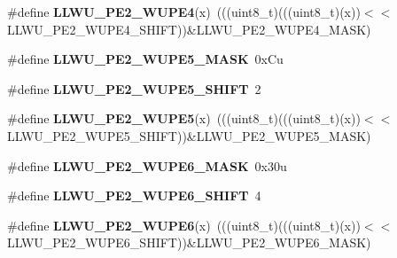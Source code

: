 \begin{DoxyCompactItemize}
\item 
\#define {\bfseries L\+L\+W\+U\+\_\+\+P\+E2\+\_\+\+W\+U\+P\+E4}(x)~(((uint8\+\_\+t)(((uint8\+\_\+t)(x))$<$$<$L\+L\+W\+U\+\_\+\+P\+E2\+\_\+\+W\+U\+P\+E4\+\_\+\+S\+H\+I\+FT))\&L\+L\+W\+U\+\_\+\+P\+E2\+\_\+\+W\+U\+P\+E4\+\_\+\+M\+A\+SK)\hypertarget{group__LLWU__Register__Masks_gadd7ab2866ab9683237ee5d6c003cf2aa}{}\label{group__LLWU__Register__Masks_gadd7ab2866ab9683237ee5d6c003cf2aa}

\item 
\#define {\bfseries L\+L\+W\+U\+\_\+\+P\+E2\+\_\+\+W\+U\+P\+E5\+\_\+\+M\+A\+SK}~0x\+Cu\hypertarget{group__LLWU__Register__Masks_gacfb855231e7a1c11c64d8b4e951817be}{}\label{group__LLWU__Register__Masks_gacfb855231e7a1c11c64d8b4e951817be}

\item 
\#define {\bfseries L\+L\+W\+U\+\_\+\+P\+E2\+\_\+\+W\+U\+P\+E5\+\_\+\+S\+H\+I\+FT}~2\hypertarget{group__LLWU__Register__Masks_ga4e823ada9bfc21dca4729eedf4e63778}{}\label{group__LLWU__Register__Masks_ga4e823ada9bfc21dca4729eedf4e63778}

\item 
\#define {\bfseries L\+L\+W\+U\+\_\+\+P\+E2\+\_\+\+W\+U\+P\+E5}(x)~(((uint8\+\_\+t)(((uint8\+\_\+t)(x))$<$$<$L\+L\+W\+U\+\_\+\+P\+E2\+\_\+\+W\+U\+P\+E5\+\_\+\+S\+H\+I\+FT))\&L\+L\+W\+U\+\_\+\+P\+E2\+\_\+\+W\+U\+P\+E5\+\_\+\+M\+A\+SK)\hypertarget{group__LLWU__Register__Masks_ga956b7d4a8e1a041de809612c0cad83e3}{}\label{group__LLWU__Register__Masks_ga956b7d4a8e1a041de809612c0cad83e3}

\item 
\#define {\bfseries L\+L\+W\+U\+\_\+\+P\+E2\+\_\+\+W\+U\+P\+E6\+\_\+\+M\+A\+SK}~0x30u\hypertarget{group__LLWU__Register__Masks_ga0db50e96153e1ca74874da97d1c22f41}{}\label{group__LLWU__Register__Masks_ga0db50e96153e1ca74874da97d1c22f41}

\item 
\#define {\bfseries L\+L\+W\+U\+\_\+\+P\+E2\+\_\+\+W\+U\+P\+E6\+\_\+\+S\+H\+I\+FT}~4\hypertarget{group__LLWU__Register__Masks_gaa7a0191eaf60166333a8bee953239c85}{}\label{group__LLWU__Register__Masks_gaa7a0191eaf60166333a8bee953239c85}

\item 
\#define {\bfseries L\+L\+W\+U\+\_\+\+P\+E2\+\_\+\+W\+U\+P\+E6}(x)~(((uint8\+\_\+t)(((uint8\+\_\+t)(x))$<$$<$L\+L\+W\+U\+\_\+\+P\+E2\+\_\+\+W\+U\+P\+E6\+\_\+\+S\+H\+I\+FT))\&L\+L\+W\+U\+\_\+\+P\+E2\+\_\+\+W\+U\+P\+E6\+\_\+\+M\+A\+SK)\hypertarget{group__LLWU__Register__Masks_gaa96b35faf789a4b85552957c8227c1e0}{}\label{group__LLWU__Register__Masks_gaa96b35faf789a4b85552957c8227c1e0}


\end{DoxyCompactItemize}
